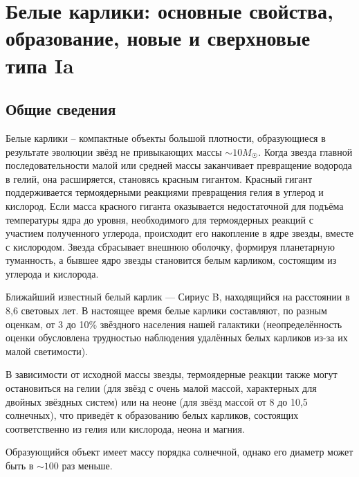 \section{Белые карлики: основные свойства, образование, новые и сверхновые типа Ia}
\subsection{Общие сведения}
Белые карлики -- компактные объекты большой плотности, образующиеся в результате эволюции звёзд не привыкающих массы $\sim 10M_{\Sun}$. Когда звезда главной последовательности малой или средней массы заканчивает превращение водорода в гелий, она расширяется, становясь красным гигантом. Красный гигант поддерживается термоядерными реакциями превращения гелия в углерод и кислород. Если масса красного гиганта оказывается недостаточной для подъёма температуры ядра до уровня, необходимого для термоядерных реакций с участием полученного углерода, происходит его накопление в ядре звезды, вместе с кислородом. Звезда сбрасывает внешнюю оболочку, формируя планетарную туманность, а бывшее ядро звезды становится белым карликом, состоящим из углерода и кислорода.

Ближайший известный белый карлик — Сириус B, находящийся на расстоянии в 8,6 световых лет. В настоящее время белые карлики составляют, по разным оценкам, от 3 до 10\% звёздного населения нашей галактики (неопределённость оценки обусловлена трудностью наблюдения удалённых белых карликов из-за их малой светимости).

В зависимости от исходной массы звезды, термоядерные реакции также могут остановиться на гелии (для звёзд с очень малой массой, характерных для двойных звёздных систем) или на неоне (для звёзд массой от 8 до 10,5 солнечных), что приведёт к образованию белых карликов, состоящих соответственно из гелия или кислорода, неона и магния.

Образующийся объект имеет массу порядка солнечной, однако его диаметр может быть в $\sim 100$ раз меньше.  
